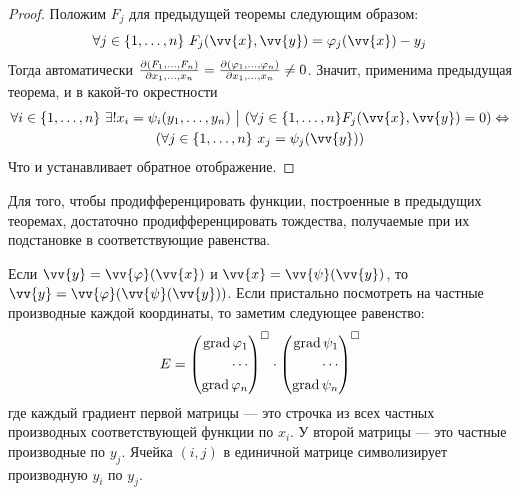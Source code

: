 \begin{proof}
	Положим $F_j$ для предыдущей теоремы следующим образом:
	\[
		\forall j \in \range{n}\ F_j(\vv{x}, \vv{y}) = \phi_j(\vv{x}) - y_j
	\]
	Тогда автоматически $\frac{\partial (F_1, \ldots, F_n)}{\partial x_1, \ldots, x_n} = \frac{\partial (\varphi_1, \ldots, \varphi_n)}{\partial x_1, \ldots, x_n} \neq 0$. Значит, применима предыдущая теорема, и в какой-то окрестности
	\begin{multline*}
		\forall i \in \range{n}\ \exists! x_i = \psi_i(y_1, \ldots, y_n) \such (\forall j \in \range{n} F_j(\vv{x}, \vv{y}) = 0) \lra
		\\
		(\forall j \in \range{n}\ x_j = \psi_j(\vv{y}))
	\end{multline*}
	Что и устанавливает обратное отображение.
\end{proof}

\begin{note}
	Для того, чтобы продифференцировать функции, построенные в предыдущих теоремах, достаточно продифференцировать тождества, получаемые при их подстановке в соответствующие равенства.
	
	Если $\vv{y} = \vv{\phi}(\vv{x})$ и $\vv{x} = \vv{\psi}(\vv{y})$, то $\vv{y} = \vv{\phi}(\vv{\psi}(\vv{y}))$. Если пристально посмотреть на частные производные каждой координаты, то заметим следующее равенство:
	\[
		E = \left(\begin{aligned}\operatorname{grad} \varphi_1 \\ \cdots \\ \operatorname{grad} \varphi_n\end{aligned}\right)^{\square} \cdot \left(\begin{aligned}\operatorname{grad} \psi_1 \\ \cdots \\ \operatorname{grad} \psi_n\end{aligned}\right)^{\square}
	\]
	где каждый градиент первой матрицы --- это строчка из всех частных производных соответствующей функции по $x_i$. У второй матрицы --- это частные производные по $y_j$. Ячейка $(i, j)$ в единичной матрице символизирует производную $y_i$ по $y_j$.
\end{note}
